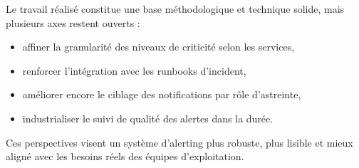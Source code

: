 Le travail réalisé constitue une base méthodologique et technique solide, mais plusieurs axes restent ouverts :
\begin{itemize}
	\item affiner la granularité des niveaux de criticité selon les services,
	\item renforcer l'intégration avec les runbooks d'incident,
	\item améliorer encore le ciblage des notifications par rôle d'astreinte,
	\item industrialiser le suivi de qualité des alertes dans la durée.
\end{itemize}

Ces perspectives visent un système d'alerting plus robuste, plus lisible et mieux aligné avec les besoins réels des
équipes d'exploitation.